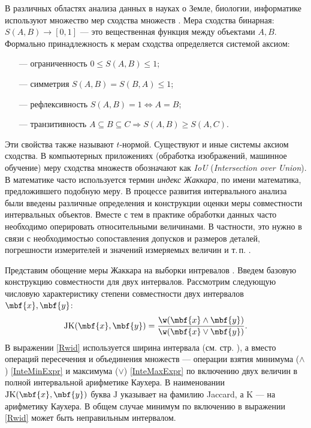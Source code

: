 \documentclass[a5paper,openany]{book}
\begin{document}
В различных областях анализа данных в науках о Земле, биологии, информатике используют множество мер сходства множеств \cite{Jaccard}.  
Мера сходства бинарная: $S(A, B) \rightarrow [0, 1] $ --- это вещественная функция между объектами $A, B$. 
Формально  принадлежность к мерам сходства определяется системой аксиом:
\begin{itemize}
\item[---] ограниченность $0 \leq 	S(A, B)  \leq 1 $;
\item[---] симметрия $	S(A, B) = S(B,A)  \leq 1$;
\item[---] рефлексивность $	S(A, B)=1  \Longleftrightarrow A=B $;
\item[---] транзитивность $ 	A \subseteq B \subseteq C \Longrightarrow   S(A, B) \geq S(A, C)  $.
\end{itemize}
Эти свойства также называют $t$-нормой. Существуют и иные системы аксиом сходства.
   
В компьютерных приложениях (обработка изображений, машинное обучение) меру сходства множеств  обозначают как \emph{IoU} (\emph{Intersection over Union}). В математике часто используется термин \emph{индекс Жаккара}, по имени математика, предложившего подобную меру.
\label{JaccardMeasure}
В процессе развития интервального анализа были введены различные определения и конструкции оценки меры совместности интервальных объектов.
Вместе с тем в практике обработки данных часто необходимо оперировать относительными величинами. В частности, это нужно в связи с необходимостью сопоставления допусков и размеров деталей, погрешности измерителей и значений измеряемых величин и т.\,п. \cite{Kabir2017}.

Представим обощение меры Жаккара на выборки интревалов \cite{Jaccard2022}.
Введем базовую конструкцию совместности для двух интервалов.
Рассмотрим  следующую числовую характеристику степени совместности  двух интервалов $\mbf{x}, \mbf{y}$:
\begin{equation}\label{Rwid}
\mathrm{JK}(\mbf{x}, \mbf{y}) = 
\frac{\w (\mbf{x} \wedge \mbf{y} )}{\w (\mbf{x} \vee \mbf{y})}.
\end{equation}
В выражении \eqref{Rwid} используется ширина интервала (см. стр. \pageref{InteWid}), а вместо операций пересечения и объединения множеств --- операции взятия  минимума ($\wedge$) \eqref{InteMinExpr} и максимума ($\vee$) \eqref{InteMaxExpr} по включению двух величин в полной интервальной арифметике Каухера. В наименовании $\mathrm{JK}(\mbf{x}, \mbf{y})$ буква $\mathrm{J}$ указывает на фамилию 
Jaccard, а $\mathrm{K}$ --- на арифметику Каухера.
В общем случае минимум по включению в выражении \eqref{Rwid} может быть неправильным интервалом. 
\end{document}
